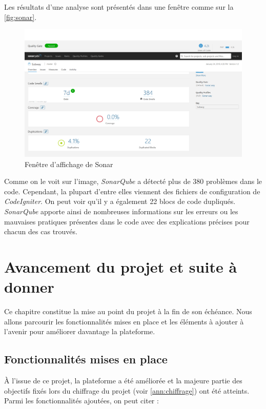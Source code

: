 \documentclass[noposter]{polytech/polytech}
\begin{document}
Les résultats d'une analyse sont présentés dans une fenêtre comme sur la \autoref{fig:sonar}.

\begin{figure}
	\includegraphics[scale=0.25]{images/sonar_scanner1}
	\caption{Fenêtre d'affichage de Sonar}
	\label{fig:sonar}
\end{figure}

Comme on le voit sur l'image, \textit{SonarQube} a détecté plus de 380 problèmes dans le code. Cependant, la plupart d'entre elles viennent des fichiers de configuration de \textit{CodeIgniter}. On peut voir qu'il y a également 22 blocs de code dupliqués. \textit{SonarQube} apporte ainsi de nombreuses informations sur les erreurs ou les mauvaises pratiques présentes dans le code avec des explications précises pour chacun des cas trouvés.


\chapter{Avancement du projet et suite à donner}


Ce chapitre constitue la mise au point du projet à la fin de son échéance. Nous allons parcourir les fonctionnalités mises en place et les éléments à ajouter à l'avenir pour améliorer davantage la plateforme.

\section{Fonctionnalités mises en place}

À l'issue de ce projet, la plateforme a été améliorée et la majeure partie des objectifs fixés lors du chiffrage du projet (voir \autoref{ann:chiffrage}) ont été atteints. Parmi les fonctionnalités ajoutées, on peut citer :
\end{document}
